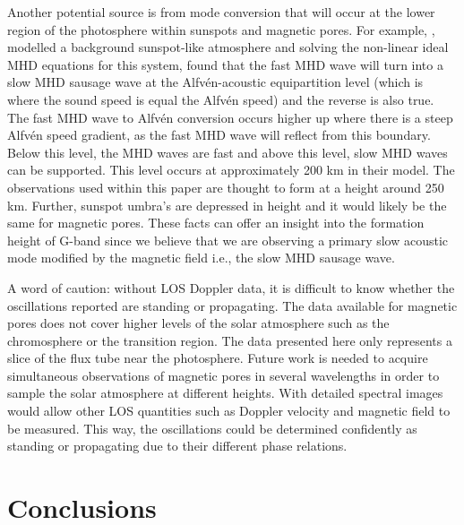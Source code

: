 	Another potential source is from mode conversion that will occur at the lower region of the photosphere within sunspots and magnetic pores.
	For example, \cite{0004-637X-746-1-68}, modelled a background sunspot-like atmosphere and solving the non-linear ideal MHD equations for this system, found that the fast MHD wave will turn into a slow MHD sausage wave at the Alfv\'en-acoustic equipartition level (which is where the sound speed is equal the Alfv\'en speed) and the reverse is also true.
	The fast MHD wave to Alfv\'en conversion occurs higher up where there is a steep Alfv\'en speed gradient, as the fast MHD wave will reflect from this boundary.
	Below this level, the MHD waves are fast and above this level, slow MHD waves can be supported.
	This level occurs at approximately 200 km in their model.
	The observations used within this paper are thought to form at a height around 250 km.
	Further, sunspot umbra's are depressed in height and it would likely be the same for magnetic pores.
	These facts can offer an insight into the formation height of G-band since we believe that we are observing a primary slow acoustic mode modified by the magnetic field i.e., the slow MHD sausage wave.
	    
    A word of caution: without LOS Doppler data, it is difficult to know whether the oscillations reported are standing or propagating.
    The data available for magnetic pores does not cover higher levels of the solar atmosphere such as the chromosphere or the transition region.
    The data presented here only represents a slice of the flux tube near the photosphere.
    Future work is needed to acquire simultaneous observations of magnetic pores in several wavelengths in order to sample the solar atmosphere at different heights.
    With detailed spectral images would allow other LOS quantities such as Doppler velocity and magnetic field to be measured.
    This way, the oscillations could be determined confidently as standing or propagating due to their different phase relations. 
    
    \section{Conclusions}
    \label{conc}
    
